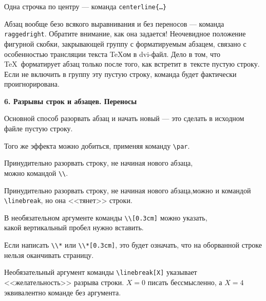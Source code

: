 \documentclass{article}
\begin{document}
\bigskip

\centerline{Одна строчка по центру --- команда \texttt{centerline\{\ldots\}}}

\bigskip

{\raggedright
Абзац вообще безо всякого выравнивания и без переносов --- команда \texttt{raggedright}. Обратите внимание, как она задается! Неочевидное положение фигурной скобки, закрывающей группу с форматируемым абзацем, связано с особенностью трансляции текста \TeX ом в dvi-файл. Дело в том, что \TeX\ форматирует абзац только после того, как встретит в~тексте пустую строку. Если не включить в группу эту пустую строку, команда будет фактически проигнорирована.

}

\newpage

\textbf{6. Разрывы строк и абзацев. Переносы}


\bigskip

Основной способ разорвать абзац и начать новый --- это сделать в исходном файле пустую строку. \par Того же эффекта можно добиться, применяя команду \verb"\par".

\bigskip

Принудительно разорвать строку, не начиная нового абзаца,\\ можно командой \verb"\\".

\bigskip

Принудительно разорвать строку, не начиная нового абзаца,\linebreak можно и командой \verb"\linebreak", но она <<тянет>> строки.

\bigskip

В необязательном аргументе команды \verb"\\[0.3cm]" можно указать,\\[0.3cm] какой вертикальный пробел нужно вставить.

\bigskip

Если написать \verb"\\*" или \verb"\\*[0.3cm]", это будет означать, что на оборванной строке нельзя оканчивать страницу.

\bigskip

Необязательный аргумент команды \verb"\linebreak[X]" указывает <<желательность>> разрыва строки. $X=0$ писать бессмысленно, а $X=4$ эквивалентно команде без аргумента.
\end{document}
